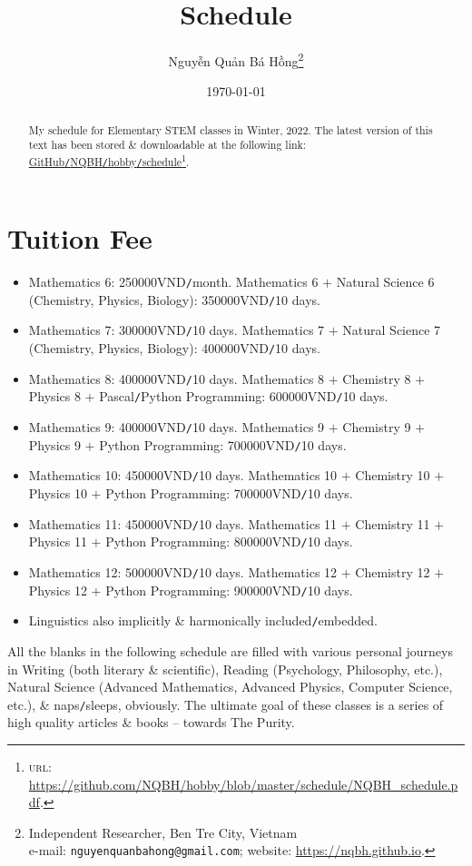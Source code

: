 \documentclass[landscape,a4paper]{article}
\title{Schedule}
\author{\selectlanguage{vietnamese} Nguyễn Quản Bá Hồng\footnote{Independent Researcher, Ben Tre City, Vietnam\\e-mail: \texttt{nguyenquanbahong@gmail.com}; website: \url{https://nqbh.github.io}.}}
\date{\today}
\begin{document}
\maketitle
\begin{abstract}
	My schedule for Elementary STEM classes in Winter, 2022. The latest version of this text has been stored \& downloadable at the following link: \href{https://github.com/NQBH/hobby/blob/master/schedule/NQBH_schedule.pdf}{GitHub\texttt{/}NQBH\texttt{/}hobby\texttt{/}schedule}\footnote{\textsc{url}: \url{https://github.com/NQBH/hobby/blob/master/schedule/NQBH_schedule.pdf}.}.
\end{abstract}

\section*{Tuition Fee}
\begin{itemize}
	\item Mathematics 6: 250000VND\texttt{/}month. Mathematics 6 $+$ Natural Science 6 (Chemistry, Physics, Biology): 350000VND\texttt{/}10 days.
	\item Mathematics 7: 300000VND\texttt{/}10 days. Mathematics 7 $+$ Natural Science 7 (Chemistry, Physics, Biology): 400000VND\texttt{/}10 days.
	\item Mathematics 8: 400000VND\texttt{/}10 days. Mathematics 8 $+$ Chemistry 8 $+$ Physics $8$ + Pascal\texttt{/}Python Programming: 600000VND\texttt{/}10 days.
	\item Mathematics 9: 400000VND\texttt{/}10 days. Mathematics 9 $+$ Chemistry 9 $+$ Physics 9 $+$ Python Programming: 700000VND\texttt{/}10 days.
	\item Mathematics 10: 450000VND\texttt{/}10 days. Mathematics 10 $+$ Chemistry 10 $+$ Physics 10 $+$ Python Programming: 700000VND\texttt{/}10 days.
	\item Mathematics 11: 450000VND\texttt{/}10 days. Mathematics 11 $+$ Chemistry 11 $+$ Physics 11 $+$ Python Programming: 800000VND\texttt{/}10 days.
	\item Mathematics 12: 500000VND\texttt{/}10 days. Mathematics 12 $+$ Chemistry 12 $+$ Physics 12 $+$ Python Programming: 900000VND\texttt{/}10 days.
	\item Linguistics also implicitly \& harmonically included\texttt{/}embedded.
\end{itemize}
All the blanks in the following schedule are filled with various personal journeys in Writing (both literary \& scientific), Reading (Psychology, Philosophy, etc.), Natural Science (Advanced Mathematics, Advanced Physics, Computer Science, etc.), \& naps\texttt{/}sleeps, obviously. The ultimate goal of these classes is a series of high quality articles \& books -- towards The Purity.
\end{document}
